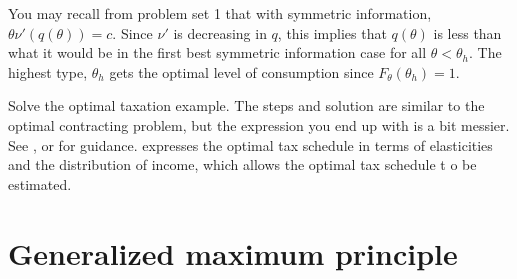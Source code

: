 You may recall from problem set 1 that with symmetric information,
$\theta \nu'(q(\theta)) = c$. Since $\nu'$ is decreasing in $q$, this
implies that $q(\theta)$ is less than what it would be in the first
best symmetric information case for all $\theta < \theta_h$. The
highest type, $\theta_h$ gets the optimal level of consumption since
$F_\theta(\theta_h) = 1$. 

\begin{exercise}[difficult]
  Solve the optimal taxation example. The steps and solution are
  similar to the optimal contracting problem, but the expression you
  end up with is a bit messier. See \cite{mirrlees1971}, or
  \cite{diamond1998} for guidance. \cite{saez2001} expresses the
  optimal tax schedule in terms of elasticities and the distribution
  of income, which allows the optimal tax schedule t
o be estimated. 
\end{exercise}

\appendix

\section{Generalized maximum principle}

